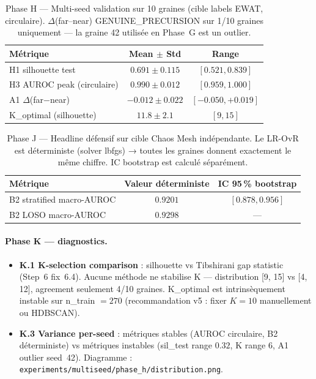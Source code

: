 \begin{table}[h]
\centering
\caption{Phase H — Multi-seed validation sur 10 graines (cible labels EWAT,
circulaire). $\Delta$(far--near) GENUINE\_PRECURSION sur 1/10 graines
uniquement — la graine 42 utilisée en Phase~G est un outlier.}
\label{tab:phase_h_multiseed}
\begin{tabular}{lcc}
\toprule
\textbf{Métrique} & \textbf{Mean $\pm$ Std} & \textbf{Range} \\
\midrule
H1 silhouette test         & $0.691 \pm 0.115$  & $[0.521, 0.839]$ \\
H3 AUROC peak (circulaire) & $0.990 \pm 0.012$  & $[0.959, 1.000]$ \\
A1 $\Delta$(far$-$near)    & $-0.012 \pm 0.022$ & $[-0.050, +0.019]$ \\
K\_optimal (silhouette)    & $11.8 \pm 2.1$     & $[9, 15]$ \\
\bottomrule
\end{tabular}
\end{table}

\begin{table}[h]
\centering
\caption{Phase J — Headline défensif sur cible Chaos Mesh indépendante.
Le LR-OvR est déterministe (solver lbfgs) → toutes les graines donnent
exactement le même chiffre. IC bootstrap est calculé séparément.}
\label{tab:phase_j_multiseed}
\begin{tabular}{lcc}
\toprule
\textbf{Métrique} & \textbf{Valeur déterministe} & \textbf{IC 95\,\% bootstrap} \\
\midrule
B2 stratified macro-AUROC & $\mathbf{0.9201}$ & $[0.878, 0.956]$ \\
B2 LOSO macro-AUROC       & $0.9298$          & --- \\
\bottomrule
\end{tabular}
\end{table}

\paragraph{Phase K --- diagnostics.}
\begin{itemize}
  \item \textbf{K.1 K-selection comparison} : silhouette vs Tibshirani gap
    statistic (Step~6 fix~6.4). Aucune méthode ne stabilise K — distribution
    [9, 15] vs [4, 12], agreement seulement 4/10 graines. K\_optimal est
    intrinsèquement instable sur n\_train $= 270$ (recommandation v5 :
    fixer $K = 10$ manuellement ou HDBSCAN).
  \item \textbf{K.3 Variance per-seed} : métriques stables (AUROC circulaire,
    B2 déterministe) vs métriques instables (sil\_test range $0.32$,
    K range $6$, A1 outlier seed~42). Diagramme :
    \texttt{experiments/multiseed/phase\_h/distribution.png}.
\end{itemize}

